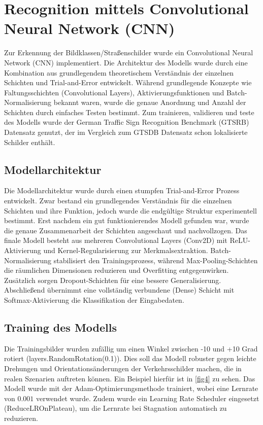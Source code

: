\documentclass[runningheads]{llncs}
\begin{document}
\section{Recognition mittels Convolutional Neural Network (CNN)}
Zur Erkennung der Bildklassen/Straßenschilder wurde ein Convolutional Neural Network (CNN) implementiert. Die Architektur des Modells wurde
durch eine Kombination aus grundlegendem theoretischem Verständnis der einzelnen Schichten und Trial-and-Error entwickelt.
Während grundlegende Konzepte wie Faltungsschichten (Convolutional Layers), Aktivierungsfunktionen und Batch-Normalisierung
bekannt waren, wurde die genaue Anordnung und Anzahl der Schichten durch einfaches Testen bestimmt.
Zum trainieren, validieren und teste des Modells wurde der German Traffic Sign Recognition Benchmark (GTSRB) Datensatz genutzt, der
im Vergleich zum GTSDB Datensatz schon lokalisierte Schilder enthält.

\subsection{Modellarchitektur}
Die Modellarchitektur wurde durch einen stumpfen Trial-and-Error Prozess entwickelt. Zwar bestand ein grundlegendes Verständnis
für die einzelnen Schichten und ihre Funktion, jedoch wurde die endgültige Struktur experimentell bestimmt.
Erst nachdem ein gut funktionierendes Modell gefunden war, wurde die genaue Zusammenarbeit der Schichten angeschaut und
nachvollzogen. Das finale Modell besteht aus mehreren Convolutional Layers (Conv2D) mit ReLU-Aktivierung und Kernel-Regularisierung
zur Merkmalsextraktion. Batch-Normalisierung stabilisiert den Trainingsprozess, während Max-Pooling-Schichten die räumlichen
Dimensionen reduzieren und Overfitting entgegenwirken. Zusätzlich sorgen Dropout-Schichten für eine bessere Generalisierung.
Abschließend übernimmt eine vollständig verbundene (Dense) Schicht mit Softmax-Aktivierung die Klassifikation der Eingabedaten.

\subsection{Training des Modells}
Die Trainingsbilder wurden zufällig um einen Winkel zwischen -10 und +10 Grad rotiert (layers.RandomRotation(0.1)). Dies soll das Modell
robuster gegen leichte Drehungen und Orientationsänderungen der Verkehrsschilder machen, die in realen Szenarien auftreten können. Ein Beispiel
hierfür ist in \ref{fig4} zu sehen. Das Modell wurde mit der Adam-Optimierungsmethode trainiert, wobei eine Lernrate von $0.001$ verwendet wurde. Zudem wurde ein
Learning Rate Scheduler eingesetzt (ReduceLROnPlateau), um die Lernrate bei Stagnation automatisch zu reduzieren.
\end{document}
